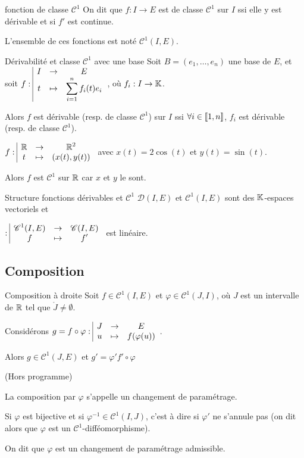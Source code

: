 \begin{definition}{fonction de classe $\mathscr C^1$}{}
    On dit que $f : I \to E$ est de classe $\mathscr C^1$ sur $I$ ssi 
    elle y est dérivable et si $f'$ est continue. 

    L'ensemble de ces fonctions est noté $\mathscr C^1(I, E)$.
\end{definition}

\begin{proposition}{Dérivabilité et classe $\mathscr C^1$ avec une base }{}
    Soit $B = (e_1, \ldots, e_n)$ une base de $E$, et soit
    $\displaystyle f: \space \begin{array}{|ccc} \displaystyle I & \to & \displaystyle E \\ \displaystyle t & \mapsto & \displaystyle \sum_{i=1}^n f_i(t)e_i \end{array}$, où $f_i : I \to \mathbb{K}$.

    Alors $f$ est dérivable (resp. de classe $\mathscr C^1$) sur $I$ ssi
    $\forall i \in [\![1, n]\!]$, $f_i$ est dérivable (resp. de classe $\mathscr C^1$).
\end{proposition}

\begin{exemple}
    $f: \space \begin{array}{|ccc} \displaystyle \mathbb{R} & \to & \displaystyle \mathbb{R}^2 \\ \displaystyle t & \mapsto & \displaystyle (x(t), y(t)) \end{array}$ avec $x(t) = 2 \cos(t)$ et $y(t) = \sin(t)$.

    Alors $f$ est $\mathscr C^1$ sur $\mathbb{R}$ car $x$ et $y$ le sont.
\end{exemple}

\begin{proposition}{Structure fonctions dérivables et $\mathscr C^1$}{}
    $\mathscr D(I, E)$ et $\mathscr C^1(I, E)$ sont des $\mathbb{K}$-espaces vectoriels et 

    $: \space \begin{array}{|ccc} \displaystyle \mathscr C^1(I, E) & \to & \displaystyle \mathscr C(I, E) \\ \displaystyle f & \mapsto & \displaystyle f' \end{array}$ est linéaire. 
\end{proposition}

\subsection{Composition }

\begin{proposition}{Composition à droite}{}
    Soit $f \in \mathscr C^1(I, E)$ et $\varphi \in \mathscr C^1(J, I)$, où $J$ est un intervalle de $\mathbb{R}$
    tel que $\mathring{J } \neq \emptyset$. 

    Considérons $g = f \circ \varphi: \space \begin{array}{|ccc} \displaystyle J & \to & \displaystyle E \\ \displaystyle u & \mapsto & \displaystyle f(\varphi(u)) \end{array}$.

    Alors $g \in \mathscr C^1(J, E)$ et $g' = \varphi' f' \circ \varphi$
    
\end{proposition}

\begin{remarque}
    (Hors programme)

    La composition par $\varphi$ s'appelle un changement de paramétrage.

    Si $\varphi$ est bijective et si $\varphi^{-1} \in \mathscr C^1(I, J)$, c'est à dire si 
    $\varphi '$ ne s'annule pas (on dit alors que $\varphi$ est un $\mathscr C^1$-difféomorphisme). 

    On dit que $\varphi$ est un changement de paramétrage admissible.
\end{remarque}

